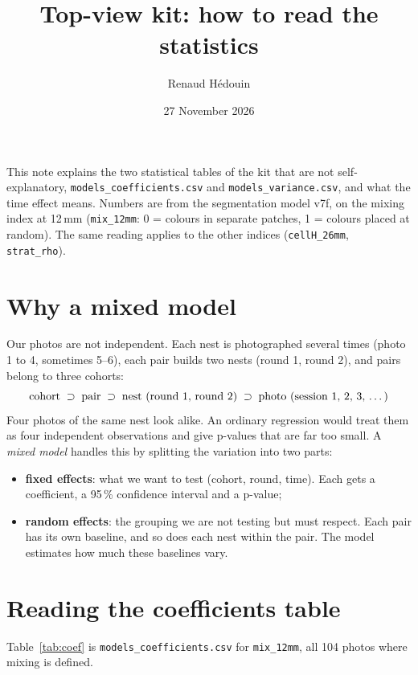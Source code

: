 \documentclass[11pt,a4paper]{article}
\title{Top-view kit: how to read the statistics}
\author{Renaud H\'edouin}
\date{27 November 2026}
\newcommand{\code}[1]{\texttt{#1}}
\begin{document}
\sloppy
\maketitle

This note explains the two statistical tables of the kit that are not self-explanatory,
\code{models\_coefficients.csv} and \code{models\_variance.csv}, and what the time effect means.
Numbers are from the segmentation model v7f, on the mixing index at 12\,mm
(\code{mix\_12mm}: 0 = colours in separate patches, 1 = colours placed at random).
The same reading applies to the other indices (\code{cellH\_26mm}, \code{strat\_rho}).

\section{Why a mixed model}

Our photos are not independent. Each nest is photographed several times (photo 1 to 4, sometimes 5--6),
each pair builds two nests (round 1, round 2), and pairs belong to three cohorts:
\[
\text{cohort} \;\supset\; \text{pair} \;\supset\; \text{nest (round 1, round 2)} \;\supset\; \text{photo (session 1, 2, 3, \dots)}
\]
Four photos of the same nest look alike. An ordinary regression would treat them as four
independent observations and give p-values that are far too small. A \emph{mixed model} handles
this by splitting the variation into two parts:
\begin{itemize}
\item \textbf{fixed effects}: what we want to test (cohort, round, time). Each gets a coefficient,
      a 95\,\% confidence interval and a p-value;
\item \textbf{random effects}: the grouping we are not testing but must respect. Each pair has its own baseline,
      and so does each nest within the pair. The model estimates how much these baselines vary.
\end{itemize}

\section{Reading the coefficients table}

Table~\ref{tab:coef} is \code{models\_coefficients.csv} for \code{mix\_12mm}, all 104 photos where mixing is defined.
\end{document}
